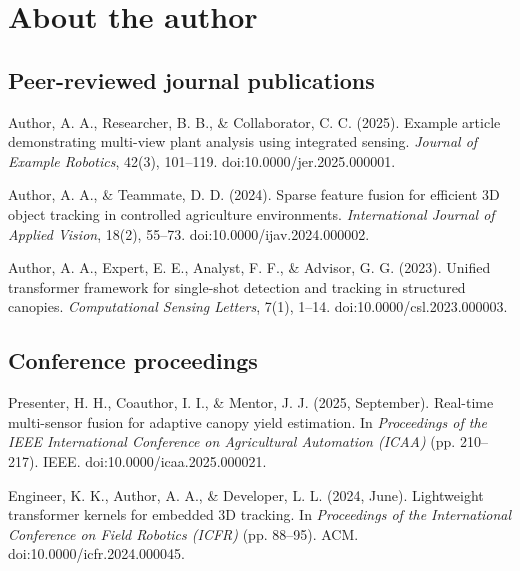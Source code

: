 \chapter{About the author}
\lipsum[1-2]

\section*{Peer-reviewed journal publications}

Author, A. A., Researcher, B. B., \& Collaborator, C. C. (2025). Example article demonstrating multi-view plant analysis using integrated sensing. \textit{Journal of Example Robotics}, 42(3), 101–119. doi:10.0000/jer.2025.000001.

Author, A. A., \& Teammate, D. D. (2024). Sparse feature fusion for efficient 3D object tracking in controlled agriculture environments. \textit{International Journal of Applied Vision}, 18(2), 55–73. doi:10.0000/ijav.2024.000002.

Author, A. A., Expert, E. E., Analyst, F. F., \& Advisor, G. G. (2023). Unified transformer framework for single-shot detection and tracking in structured canopies. \textit{Computational Sensing Letters}, 7(1), 1–14. doi:10.0000/csl.2023.000003.

\section*{Conference proceedings}

Presenter, H. H., Coauthor, I. I., \& Mentor, J. J. (2025, September). Real-time multi-sensor fusion for adaptive canopy yield estimation. In \textit{Proceedings of the IEEE International Conference on Agricultural Automation (ICAA)} (pp. 210–217). IEEE. doi:10.0000/icaa.2025.000021.

Engineer, K. K., Author, A. A., \& Developer, L. L. (2024, June). Lightweight transformer kernels for embedded 3D tracking. In \textit{Proceedings of the International Conference on Field Robotics (ICFR)} (pp. 88–95). ACM. doi:10.0000/icfr.2024.000045.

